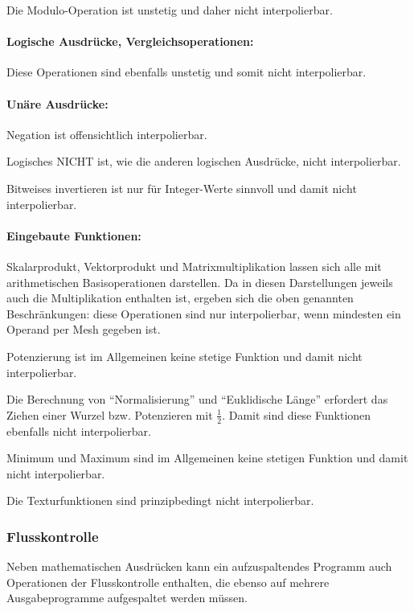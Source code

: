 \documentclass[twoside,a4paper,fleqn,12pt]{book}
\begin{document}
Die Modulo-Operation ist unstetig und daher nicht interpolierbar.

\paragraph{Logische Ausdrücke, Vergleichsoperationen:} Diese Operationen sind ebenfalls unstetig und somit nicht interpolierbar.

\paragraph{Unäre Ausdrücke:} Negation ist offensichtlich interpolierbar.

Logisches NICHT ist, wie die anderen logischen Ausdrücke, nicht interpolierbar.

Bitweises invertieren ist nur für Integer-Werte sinnvoll und damit nicht interpolierbar.

\paragraph{Eingebaute Funktionen:} \label{split_builtins}
Skalarprodukt, Vektorprodukt und Matrixmultiplikation lassen sich alle mit arithmetischen Basisoperationen darstellen.
Da in diesen Darstellungen jeweils auch die Multiplikation enthalten ist, ergeben sich die oben genannten Beschränkungen:
diese Operationen sind nur interpolierbar, wenn mindesten ein Operand per Mesh gegeben ist.

Potenzierung ist im Allgemeinen keine stetige Funktion und damit nicht interpolierbar.

Die Berechnung von "`Normalisierung"' und "`Euklidische Länge"' erfordert das Ziehen einer Wurzel bzw. Potenzieren mit $\frac{1}{2}$.
Damit sind diese Funktionen ebenfalls nicht interpolierbar.

Minimum und Maximum sind im Allgemeinen keine stetigen Funktion und damit nicht interpolierbar.

Die Texturfunktionen sind prinzipbedingt nicht interpolierbar.

\subsubsection{Flusskontrolle}

Neben mathematischen Ausdrücken kann ein aufzuspaltendes Programm auch Operationen der Flusskontrolle enthalten,
die ebenso auf mehrere Ausgabeprogramme aufgespaltet werden müssen.
\end{document}
